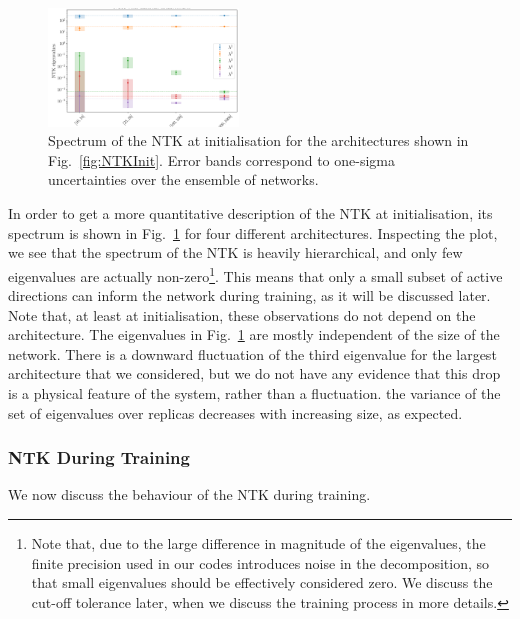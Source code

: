 \begin{figure}[t]
  \centering
  \includegraphics[width=0.45\textwidth]{figs/section_3/ntk_initialization_arch.pdf}
  \caption{Spectrum of the NTK at initialisation for the architectures shown in
  Fig.~\ref{fig:NTKInit}. Error bands correspond to one-sigma uncertainties over
  the ensemble of networks.}
  \label{fig:NTKSpectrum}
\end{figure}

In order to get a more quantitative description of the NTK at initialisation,
its spectrum is shown in Fig.~\ref{fig:NTKSpectrum} for four different
architectures. Inspecting the plot, we see that the spectrum of the NTK is
heavily hierarchical, and only few eigenvalues are actually
non-zero\footnote{Note that, due to the large difference in magnitude of the
eigenvalues, the finite precision used in our codes introduces noise in the
decomposition, so that small eigenvalues should be effectively considered zero.
We discuss the cut-off tolerance later, when we discuss the training process in
more details.}. This means that only a small subset of active directions can
inform the network during training, as it will be discussed later. Note that, at
least at initialisation, these observations do not depend on the architecture.
The eigenvalues in Fig.~\ref{fig:NTKSpectrum} are mostly independent of the size
of the network. There is a downward fluctuation of the third eigenvalue for the
largest architecture that we considered, but we do not have any evidence that
this drop is a physical feature of the system, rather than a fluctuation. the
variance of the set of eigenvalues over replicas decreases with increasing size,
as expected. 


\subsubsection{NTK During Training}
\label{sec:NTKDuringTraining}

We now discuss the behaviour of the NTK during training. 

